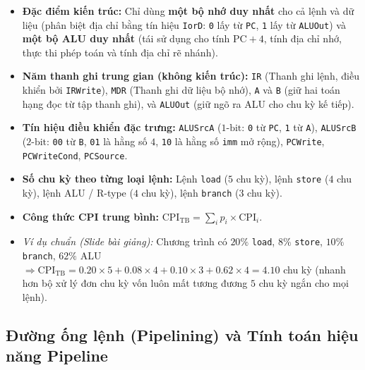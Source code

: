 \begin{itemize}
    \item \textbf{Đặc điểm kiến trúc:} Chỉ dùng \textbf{một bộ nhớ duy nhất} cho cả lệnh và dữ liệu (phân biệt địa chỉ bằng tín hiệu \texttt{IorD}: \texttt{0} lấy từ \texttt{PC}, \texttt{1} lấy từ \texttt{ALUOut}) và \textbf{một bộ ALU duy nhất} (tái sử dụng cho tính $\text{PC}+4$, tính địa chỉ nhớ, thực thi phép toán và tính địa chỉ rẽ nhánh).
    \item \textbf{Năm thanh ghi trung gian (không kiến trúc):} \texttt{IR} (Thanh ghi lệnh, điều khiển bởi \texttt{IRWrite}), \texttt{MDR} (Thanh ghi dữ liệu bộ nhớ), \texttt{A} và \texttt{B} (giữ hai toán hạng đọc từ tập thanh ghi), và \texttt{ALUOut} (giữ ngõ ra ALU cho chu kỳ kế tiếp).
    \item \textbf{Tín hiệu điều khiển đặc trưng:} \texttt{ALUSrcA} ($1\text{-bit}$: \texttt{0} từ \texttt{PC}, \texttt{1} từ \texttt{A}), \texttt{ALUSrcB} ($2\text{-bit}$: \texttt{00} từ \texttt{B}, \texttt{01} là hằng số $4$, \texttt{10} là hằng số \texttt{imm} mở rộng), \texttt{PCWrite}, \texttt{PCWriteCond}, \texttt{PCSource}.
\end{itemize}

\begin{tcolorbox}[bwbox, title={Số chu kỳ thực thi (CPI) của Bộ xử lý đa chu kỳ so với đơn chu kỳ}]
\begin{itemize}
    \item \textbf{Số chu kỳ theo từng loại lệnh:} Lệnh \texttt{load} ($5$ chu kỳ), lệnh \texttt{store} ($4$ chu kỳ), lệnh ALU / R-type ($4$ chu kỳ), lệnh \texttt{branch} ($3$ chu kỳ).
    \item \textbf{Công thức CPI trung bình:} $\text{CPI}_{\text{TB}} = \sum_{i} p_i \times \text{CPI}_i$.
    \item \textit{Ví dụ chuẩn (Slide bài giảng):} Chương trình có $20\%$ \texttt{load}, $8\%$ \texttt{store}, $10\%$ \texttt{branch}, $62\%$ ALU $\Rightarrow \text{CPI}_{\text{TB}} = 0.20 \times 5 + 0.08 \times 4 + 0.10 \times 3 + 0.62 \times 4 = \mathbf{4.10}$ chu kỳ (nhanh hơn bộ xử lý đơn chu kỳ vốn luôn mất tương đương $5$ chu kỳ ngắn cho mọi lệnh).
\end{itemize}
\end{tcolorbox}

\subsection{Đường ống lệnh (Pipelining) và Tính toán hiệu năng Pipeline}

